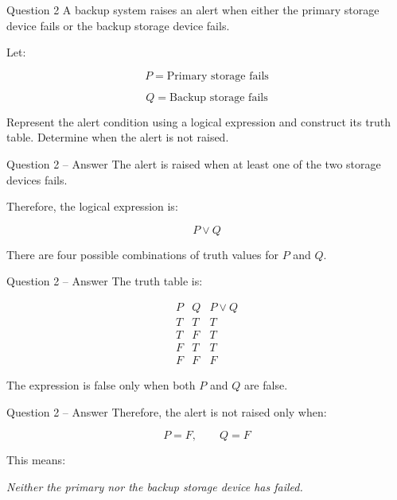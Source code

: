 
\begin{frame}{Question 2}
A backup system raises an alert when either the primary storage device
fails or the backup storage device fails.

Let:

$$
P = \text{Primary storage fails}
$$

$$
Q = \text{Backup storage fails}
$$

Represent the alert condition using a logical expression and construct its
truth table. Determine when the alert is not raised.
\end{frame}

\begin{frame}{Question 2 -- Answer}
The alert is raised when at least one of the two storage devices fails.

Therefore, the logical expression is:

$$
P \lor Q
$$

There are four possible combinations of truth values for $P$ and $Q$.
\end{frame}

\begin{frame}{Question 2 -- Answer}
The truth table is:

$$
\begin{matrix}
P & Q & P\lor Q \\
T & T & T \\
T & F & T \\
F & T & T \\
F & F & F
\end{matrix}
$$

The expression is false only when both $P$ and $Q$ are false.
\end{frame}

\begin{frame}{Question 2 -- Answer}
Therefore, the alert is not raised only when:

$$
P=F,\qquad Q=F
$$

This means:

\begin{center}
\textit{Neither the primary nor the backup storage device has failed.}
\end{center}
\end{frame}


